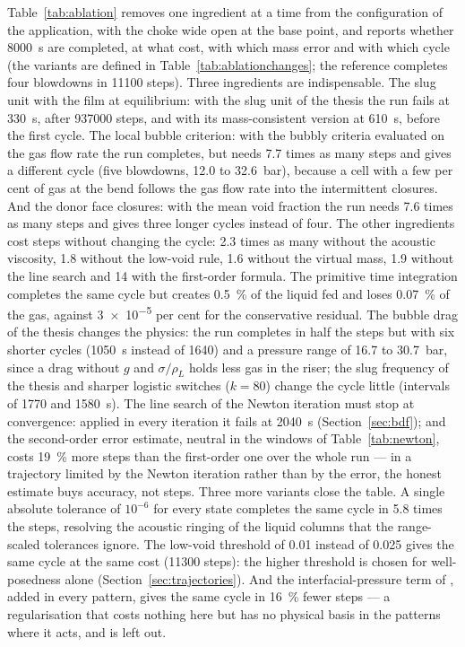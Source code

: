 \documentclass[a4paper,fleqn]{cas-sc}
\begin{document}
Table~\ref{tab:ablation} removes one ingredient at a time from the configuration of the application, with the choke wide open at the base point, and reports whether \SI{8000}{\second} are completed, at what cost, with which mass error and with which cycle (the variants are defined in Table~\ref{tab:ablationchanges}; the reference completes four blowdowns in \num{11100} steps). Three ingredients are indispensable. The slug unit with the film at equilibrium: with the slug unit of the thesis the run fails at \SI{330}{\second}, after \num{937000} steps, and with its mass-consistent version at \SI{610}{\second}, before the first cycle. The local bubble criterion: with the bubbly criteria evaluated on the gas flow rate the run completes, but needs 7.7 times as many steps and gives a different cycle (five blowdowns, 12.0 to \SI{32.6}{\bar}), because a cell with a few per cent of gas at the bend follows the gas flow rate into the intermittent closures. And the donor face closures: with the mean void fraction the run needs 7.6 times as many steps and gives three longer cycles instead of four. The other ingredients cost steps without changing the cycle: 2.3 times as many without the acoustic viscosity, 1.8 without the low-void rule, 1.6 without the virtual mass, 1.9 without the line search and 14 with the first-order formula. The primitive time integration completes the same cycle but creates \SI{0.5}{\percent} of the liquid fed and loses \SI{0.07}{\percent} of the gas, against \num{3e-5} per cent for the conservative residual. The bubble drag of the thesis changes the physics: the run completes in half the steps but with six shorter cycles (\SI{1050}{\second} instead of 1640) and a pressure range of 16.7 to \SI{30.7}{\bar}, since a drag without $g$ and $\sigma/\rho_L$ holds less gas in the riser; the slug frequency of the thesis and sharper logistic switches ($k = 80$) change the cycle little (intervals of 1770 and \SI{1580}{\second}). The line search of the Newton iteration must stop at convergence: applied in every iteration it fails at \SI{2040}{\second} (Section~\ref{sec:bdf}); and the second-order error estimate, neutral in the windows of Table~\ref{tab:newton}, costs \SI{19}{\percent} more steps than the first-order one over the whole run --- in a trajectory limited by the Newton iteration rather than by the error, the honest estimate buys accuracy, not steps. Three more variants close the table. A single absolute tolerance of $10^{-6}$ for every state completes the same cycle in 5.8 times the steps, resolving the acoustic ringing of the liquid columns that the range-scaled tolerances ignore. The low-void threshold of 0.01 instead of 0.025 gives the same cycle at the same cost (\num{11300} steps): the higher threshold is chosen for well-posedness alone (Section~\ref{sec:trajectories}). And the interfacial-pressure term of \citet{bestion1990}, added in every pattern, gives the same cycle in \SI{16}{\percent} fewer steps --- a regularisation that costs nothing here but has no physical basis in the patterns where it acts, and is left out.
\end{document}
